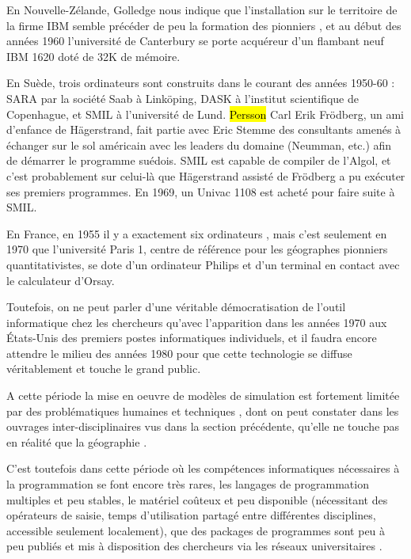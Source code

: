 En Nouvelle-Zélande, Golledge nous indique que l'installation sur le territoire de la firme IBM semble précéder de peu la formation des pionniers \autocite[94]{Bailly2000}, et au début des années 1960 l'université de Canterbury se porte acquéreur d'un flambant neuf IBM 1620 doté de 32K de mémoire.

En Suède, trois ordinateurs sont construits dans le courant des années 1950-60 : SARA par la société Saab à Linköping, DASK à l'institut scientifique de Copenhague, et SMIL à l'université de Lund. \hl{Persson} Carl Erik Frödberg, un ami d'enfance de Hägerstrand, fait partie avec Eric Stemme des consultants amenés à échanger sur le sol américain avec les leaders du domaine (Neumman, etc.) afin de démarrer le programme suédois.  SMIL est capable de compiler de l'Algol, et c'est probablement sur celui-là que Hägerstrand assisté de Frödberg a pu exécuter ses premiers programmes. En 1969, un Univac 1108 est acheté pour faire suite à SMIL.

En France, en 1955 il y a exactement six ordinateurs \autocite[3]{Armatte2008}, mais c'est seulement en 1970 que l'université Paris 1, centre de référence pour les géographes pionniers quantitativistes, se dote d'un ordinateur Philips et d'un terminal en contact avec le calculateur d'Orsay.

Toutefois, on ne peut parler d'une véritable démocratisation de l'outil informatique chez les chercheurs qu'avec l'apparition dans les années 1970 aux États-Unis des premiers postes informatiques individuels, et il faudra encore attendre le milieu des années 1980 pour que cette technologie se diffuse véritablement et touche le grand public.

A cette période la mise en oeuvre de modèles de simulation est fortement limitée par des problématiques humaines et techniques \autocites{Haggett1969}[387]{Marble1972}, dont on peut constater dans les ouvrages inter-disciplinaires vus dans la section précédente, qu'elle ne touche pas en réalité que la géographie \autocite{Guetzkow1972}.

C'est toutefois dans cette période où les compétences informatiques nécessaires à la programmation se font encore très rares, les langages de programmation multiples et peu stables, le matériel coûteux et peu disponible (nécessitant des opérateurs de saisie, temps d'utilisation partagé entre différentes disciplines, accessible seulement localement), que des packages de programmes sont peu à peu publiés et mis à disposition des chercheurs via les réseaux universitaires \autocite{Haggett1969}. 

